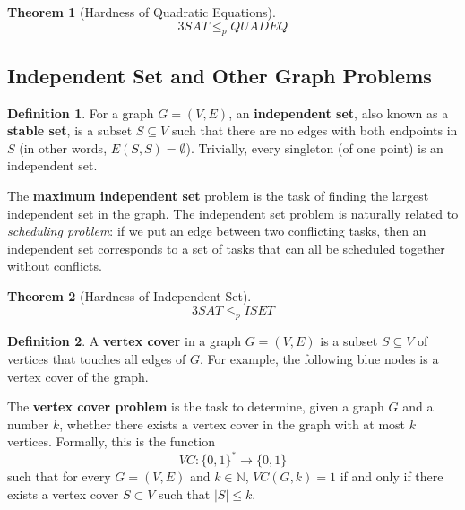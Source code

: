 \documentclass[a4paper, 12pt]{report}
\newtheorem{theorem}{Theorem}[section]
\theoremstyle{remark}
\theoremstyle{definition}
\newtheorem{definition}{Definition}[section]
\begin{document}
\begin{theorem}[Hardness of Quadratic Equations]
\[3SAT \leq_p QUADEQ\]
\end{theorem}

\subsection{Independent Set and Other Graph Problems}
\begin{definition}
For a graph $G = (V, E)$, an \textbf{independent set}, also known as a \textbf{stable set}, is a subset $S \subseteq V$ such that there are no edges with both endpoints in $S$ (in other words, $E(S, S) = \emptyset$). Trivially, every singleton (of one point) is an independent set. 
\end{definition}

The \textbf{maximum independent set} problem is the task of finding the largest independent set in the graph. The independent set problem is naturally related to \textit{scheduling problem}: if we put an edge between two conflicting tasks, then an independent set corresponds to a set of tasks that can all be scheduled together without conflicts. 

\begin{theorem}[Hardness of Independent Set]
\[3SAT \leq_p ISET\]
\end{theorem}

\begin{definition}
A \textbf{vertex cover} in a graph $G = (V, E)$ is a subset $S \subseteq V$ of vertices that touches all edges of $G$. For example, the following blue nodes is a vertex cover of the graph. 
\begin{center}
\end{center}

The \textbf{vertex cover problem} is the task to determine, given a graph $G$ and a number $k$, whether there exists a vertex cover in the graph with at most $k$ vertices. Formally, this is the function 
\[VC: \{0,1\}^* \longrightarrow \{0,1\}\]
such that for every $G = (V, E)$ and $k \in \mathbb{N}$, $VC(G, k) = 1$ if and only if there exists a vertex cover $S \subset V$ such that $|S| \leq k$. 
\end{definition}
\end{document}
